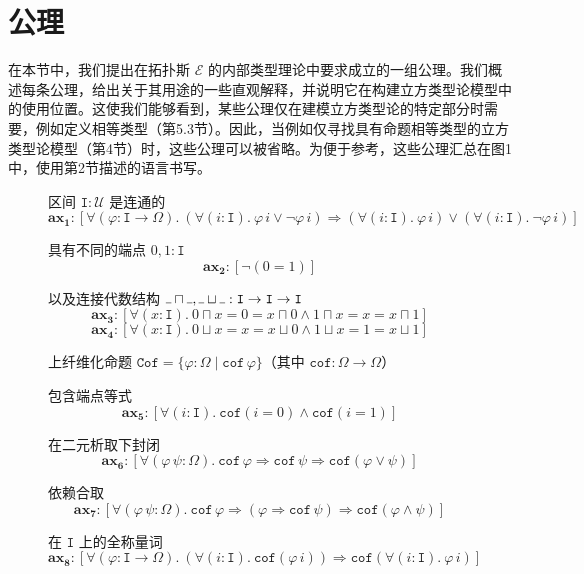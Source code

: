 \documentclass{ctexart}
\theoremstyle{plain}
\theoremstyle{definition}
\theoremstyle{definition}
\theoremstyle{definition}
\theoremstyle{definition}
\newcommand{\Cof}{\mathtt{Cof}}
\newcommand{\ax}[1]{\mathbf{ax_{#1}}}
\newcommand{\ul}{{\rule[0ex]{0.4em}{0.4pt}}} %
\numberwithin{equation}{section}
\begin{document}
\section{公理}

在本节中，我们提出在拓扑斯 $\mathcal{E}$ 的内部类型理论中要求成立的一组公理。我们概述每条公理，给出关于其用途的一些直观解释，并说明它在构建立方类型论模型中的使用位置。这使我们能够看到，某些公理仅在建模立方类型论的特定部分时需要，例如定义相等类型（第5.3节）。因此，当例如仅寻找具有命题相等类型的立方类型论模型（第4节）时，这些公理可以被省略。为便于参考，这些公理汇总在图1中，使用第2节描述的语言书写。

\begin{figure}[htbp]
\centering

区间 $\mathtt{I} : \mathcal{U}$ 是连通的
\[
\ax{1} : [\forall(\varphi : \mathtt{I} \to \Omega).\ (\forall(i : \mathtt{I}).\ \varphi\,i \lor \neg\varphi\,i) \Rightarrow (\forall(i : \mathtt{I}).\ \varphi\,i) \lor (\forall(i : \mathtt{I}).\ \neg\varphi\,i)]
\]

具有不同的端点 $0, 1 : \mathtt{I}$
\[
\ax{2} : [\neg(0 = 1)]
\]

以及连接代数结构 $\ul \sqcap\ul , \ul \sqcup\ul  : \mathtt{I} \to \mathtt{I} \to \mathtt{I}$
\[
\ax{3} : [\forall(x : \mathtt{I}).\ 0 \sqcap x = 0 = x \sqcap 0 \land 1 \sqcap x = x = x \sqcap 1]
\]
\[
\ax{4} : [\forall(x : \mathtt{I}).\ 0 \sqcup x = x = x \sqcup 0 \land 1 \sqcup x = 1 = x \sqcup 1]
\]

\vspace{1em}

上纤维化命题 $\Cof = \{\varphi : \Omega \mid \mathtt{cof}\,\varphi\}$（其中 $\mathtt{cof} : \Omega \to \Omega$）

包含端点等式
\[
\ax{5} : [\forall(i : \mathtt{I}).\ \mathtt{cof}(i = 0) \land \mathtt{cof}(i = 1)]
\]

在二元析取下封闭
\[
\ax{6} : [\forall(\varphi\,\psi : \Omega).\ \mathtt{cof}\,\varphi \Rightarrow \mathtt{cof}\,\psi \Rightarrow \mathtt{cof}(\varphi \lor \psi)]
\]

依赖合取
\[
\ax{7} : [\forall(\varphi\,\psi : \Omega).\ \mathtt{cof}\,\varphi \Rightarrow (\varphi \Rightarrow \mathtt{cof}\,\psi) \Rightarrow \mathtt{cof}(\varphi \land \psi)]
\]

在 $\mathtt{I}$ 上的全称量词
\[
\ax{8} : [\forall(\varphi : \mathtt{I} \to \Omega).\ (\forall(i : \mathtt{I}).\ \mathtt{cof}(\varphi\,i)) \Rightarrow \mathtt{cof}(\forall(i : \mathtt{I}).\ \varphi\,i)]
\]

\vspace{1em}


\end{figure}
\end{document}
